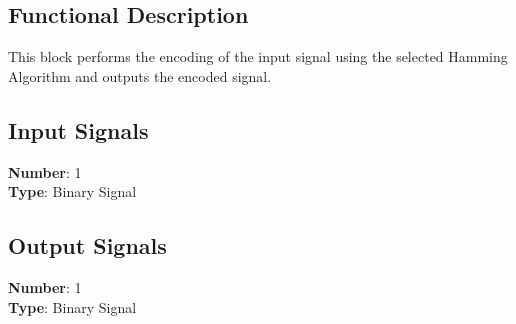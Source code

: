 \subsection*{Functional Description}

This block performs the encoding of the input signal using the selected Hamming Algorithm and outputs the encoded signal.

\subsection*{Input Signals}

\textbf{Number}: 1\\
\textbf{Type}: Binary Signal

\subsection*{Output Signals}

\textbf{Number}: 1\\
\textbf{Type}: Binary Signal

%
